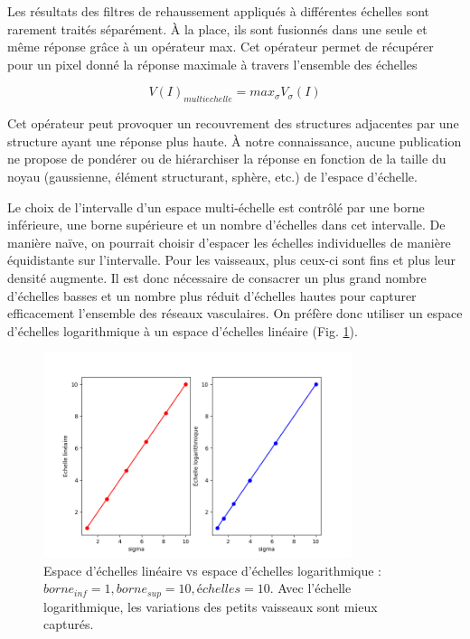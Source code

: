   Les résultats des filtres de rehaussement appliqués à différentes échelles sont rarement traités séparément. À la place, ils sont fusionnés dans une seule et même réponse grâce à un opérateur max. Cet opérateur permet de récupérer pour un pixel donné la réponse maximale à travers l'ensemble des échelles
  
  \begin{equation}
    V(I)_{multi echelle} = max_{\sigma}V_{\sigma}(I)
  \end{equation}
  
  Cet opérateur peut provoquer un recouvrement des structures adjacentes par une structure ayant une réponse plus haute. À notre connaissance, aucune publication ne propose de pondérer ou de hiérarchiser la réponse en fonction de la taille du noyau (gaussienne, élément structurant, sphère, etc.) de l'espace d'échelle.

  Le choix de l'intervalle d'un espace multi-échelle est contrôlé par une borne inférieure, une borne supérieure et un nombre d'échelles dans cet intervalle. De manière naïve, on pourrait choisir d'espacer les échelles individuelles de manière équidistante sur l'intervalle. Pour les vaisseaux, plus ceux-ci sont fins et plus leur densité augmente. Il est donc nécessaire de consacrer un plus grand nombre d'échelles basses et un nombre plus réduit d'échelles hautes pour capturer efficacement l'ensemble des réseaux vasculaires. On préfère donc utiliser un espace d'échelles logarithmique à un espace d'échelles linéaire (Fig. \ref{fig:scale_space}).

  \begin{figure}[h]
    \centering
    \includegraphics[height=6cm]{Images/scale_space.png}
    \caption{Espace d'échelles linéaire vs espace d'échelles logarithmique : $borne_{inf}=1,borne_{sup}=10,échelles=10$. Avec l'échelle logarithmique, les variations des petits vaisseaux sont mieux capturés.}
    \label{fig:scale_space}
  \end{figure}

